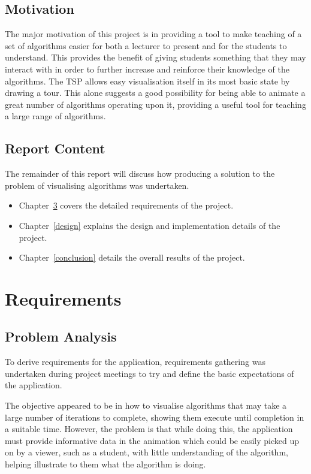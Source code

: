 \documentclass{l4proj}
\begin{document}
\section{Motivation}
The major motivation of this project is in providing a tool to make teaching of a set of algorithms easier for both a lecturer to 
present and for the students to understand. This provides the benefit of giving students something that they may interact with in order 
to further increase and reinforce their knowledge of the algorithms. The TSP allows easy visualisation itself in its most basic state by 
drawing a tour. This alone suggests a good possibility for being able to animate a great number of algorithms operating upon it, 
providing a useful tool for teaching a large range of algorithms.


\section{Report Content}
The remainder of this report will discuss how producing a solution to the problem of visualising algorithms was undertaken.
\begin{itemize}
\item Chapter~\ref{reqs} covers the detailed requirements of the project.
\item Chapter~\ref{design} explains the design and implementation details of the project.
\item Chapter~\ref{conclusion} details the overall results of the project.
\end{itemize}


\chapter{Requirements}
\label{reqs}
\section{Problem Analysis}
To derive requirements for the application, requirements gathering was undertaken during project meetings to try and define the basic 
expectations of the application.

The objective appeared to be in how to visualise algorithms that may take a large number of iterations to complete, showing them execute until 
completion in a suitable time. However, the problem is that while doing this, the application must provide informative data in the animation 
which could be easily picked up on by a viewer, such as a student, with little understanding of the algorithm, helping illustrate to them 
what the algorithm is doing.
\end{document}
